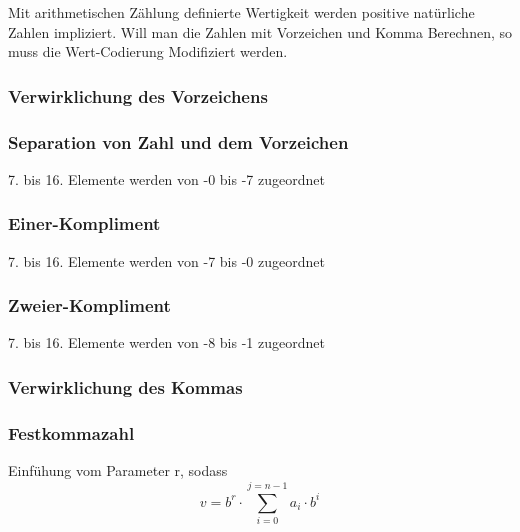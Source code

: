 \documentclass{article}
\begin{document}
    Mit arithmetischen Zählung definierte Wertigkeit werden positive natürliche Zahlen impliziert. Will man die Zahlen mit Vorzeichen und Komma Berechnen, so muss die Wert-Codierung Modifiziert werden.
    \subsubsection{Verwirklichung des Vorzeichens}
    \subsubsection*{Separation von Zahl und dem Vorzeichen}
    7. bis 16. Elemente werden von -0 bis -7 zugeordnet%
    \subsubsection*{Einer-Kompliment}
    7. bis 16. Elemente werden von -7 bis -0 zugeordnet%
    \subsubsection*{Zweier-Kompliment}
    7. bis 16. Elemente werden von -8 bis -1 zugeordnet%
    
    \subsubsection{Verwirklichung des Kommas}
    \subsubsection*{Festkommazahl}
    Einfühung vom Parameter r, sodass $$v=b^r\cdot\sum_{i=0}^{j=n-1}a_i\cdot b^i$$
\end{document}
